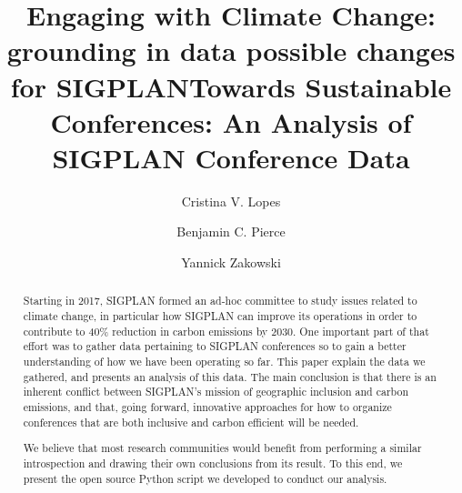 \documentclass[review, screen]{acmart}
\title{Engaging with Climate Change: grounding in data possible changes for SIGPLAN}
\newif\ifopinions\opinionstrue   %
\begin{document}
\title{Towards Sustainable Conferences: An Analysis of SIGPLAN Conference Data}

\author{Cristina V. Lopes}

\author{Benjamin C. Pierce}

\author{Yannick Zakowski}

\begin{abstract}

Starting in 2017, SIGPLAN formed an ad-hoc committee to study issues related to
climate change, in particular how SIGPLAN can improve its operations in order to
contribute to 40\% reduction in carbon emissions by 2030. One important part of
that effort was to gather data pertaining to SIGPLAN conferences so to gain a
better understanding of how we have been operating so far. This paper explain
the data we gathered, and presents an analysis of this data. The main conclusion
is that there is an inherent conflict between SIGPLAN's mission of geographic
inclusion and carbon emissions, and that, going forward, innovative approaches
for how to organize conferences that are both inclusive and carbon efficient
will be needed. 

We believe that most research communities would benefit from performing a
similar introspection and drawing their own conclusions from its result. To
this end, we present the open source Python script we developed to conduct
our analysis.

\end{abstract}


\maketitle






\ifopinions\fi


\end{document}
